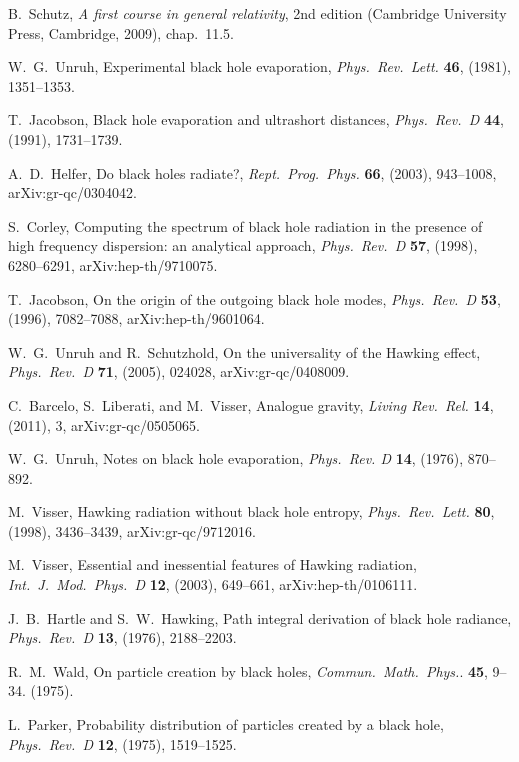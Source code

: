 \documentclass[12pt]{article}
\begin{document}
\begin{thebibliography}{999}
 B.\ Schutz, \emph{A first course in general 
relativity}, 2nd edition (Cambridge University Press, Cambridge,
2009), chap.\ 11.5.

 W.~G.\ Unruh, Experimental black hole evaporation,
\emph{Phys.\ Rev.\ Lett.} {\bf 46}, (1981), 1351--1353.

 T.\ Jacobson, Black hole evaporation and 
ultrashort distances, \emph{Phys.\ Rev.\ D} {\bf 44}, (1991),
1731--1739.

 A.~D.\ Helfer, Do black holes radiate?,
\emph{Rept.\ Prog.\ Phys.} {\bf 66}, (2003), 943--1008,
arXiv:gr-qc/0304042.

  S.\ Corley, Computing the spectrum of black 
hole radiation in the presence of high frequency dispersion: an 
analytical approach, \emph{Phys.\ Rev.\ D} {\bf 57}, (1998), 
6280--6291, arXiv:hep-th/9710075.

  T.\ Jacobson, On the origin of the outgoing 
black hole modes, \emph{Phys.\ Rev.\ D} {\bf 53},  (1996), 
7082--7088, arXiv:hep-th/9601064.

  W.~G.\ Unruh and R.\ Schutzhold, 
On the universality of the Hawking effect, \emph{Phys.\ Rev.\ D}
{\bf 71},  (2005), 024028, arXiv:gr-qc/0408009.

  C.\ Barcelo, S.\ Liberati, and M.\ Visser,
Analogue gravity, \emph{Living Rev.\ Rel.} {\bf 14}, (2011), 3,
arXiv:gr-qc/0505065.

 W.~G.\ Unruh, Notes on black hole evaporation,
\emph{Phys.\ Rev. D} {\bf 14}, (1976), 870--892.

 M.\ Visser, Hawking radiation without black hole 
entropy, \emph{Phys.\ Rev.\ Lett.} {\bf 80}, (1998), 3436--3439,
arXiv:gr-qc/9712016.

 M.\ Visser, Essential and inessential 
features of Hawking radiation, \emph{Int.\ J.\ Mod.\ Phys.\ D}
{\bf 12}, (2003), 649--661, arXiv:hep-th/0106111.

 J.~B.\ Hartle and S.~W.\ Hawking,
Path integral derivation of black hole radiance, \emph{Phys.\
Rev.\ D} {\bf 13}, (1976), 2188--2203.

 R.~M.\ Wald, On particle creation by black holes,
\emph{Commun.\ Math.\ Phys.}. {\bf 45}, 9--34. (1975).

  L.\ Parker, Probability distribution of particles 
created by a black hole, \emph{Phys.\ Rev.\ D} {\bf 12}, (1975),
1519--1525.


\end{thebibliography}
\end{document}
